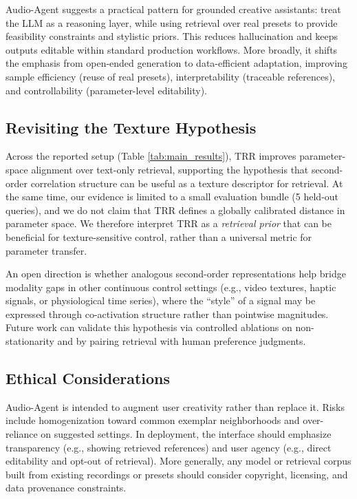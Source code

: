 \documentclass{article}
\begin{document}
Audio-Agent suggests a practical pattern for grounded creative assistants: treat the LLM as a reasoning layer, while using retrieval over real presets to provide feasibility constraints and stylistic priors. This reduces hallucination and keeps outputs editable within standard production workflows. More broadly, it shifts the emphasis from open-ended generation to data-efficient adaptation, improving sample efficiency (reuse of real presets), interpretability (traceable references), and controllability (parameter-level editability).

\subsection{Revisiting the Texture Hypothesis}

Across the reported setup (Table \ref{tab:main_results}), TRR improves parameter-space alignment over text-only retrieval, supporting the hypothesis that second-order correlation structure can be useful as a texture descriptor for retrieval. At the same time, our evidence is limited to a small evaluation bundle (5 held-out queries), and we do not claim that TRR defines a globally calibrated distance in parameter space. We therefore interpret TRR as a \textit{retrieval prior} that can be beneficial for texture-sensitive control, rather than a universal metric for parameter transfer.

An open direction is whether analogous second-order representations help bridge modality gaps in other continuous control settings (e.g., video textures, haptic signals, or physiological time series), where the ``style'' of a signal may be expressed through co-activation structure rather than pointwise magnitudes. Future work can validate this hypothesis via controlled ablations on non-stationarity and by pairing retrieval with human preference judgments.

\subsection{Ethical Considerations}

Audio-Agent is intended to augment user creativity rather than replace it. Risks include homogenization toward common exemplar neighborhoods and over-reliance on suggested settings. In deployment, the interface should emphasize transparency (e.g., showing retrieved references) and user agency (e.g., direct editability and opt-out of retrieval). More generally, any model or retrieval corpus built from existing recordings or presets should consider copyright, licensing, and data provenance constraints.
\end{document}
